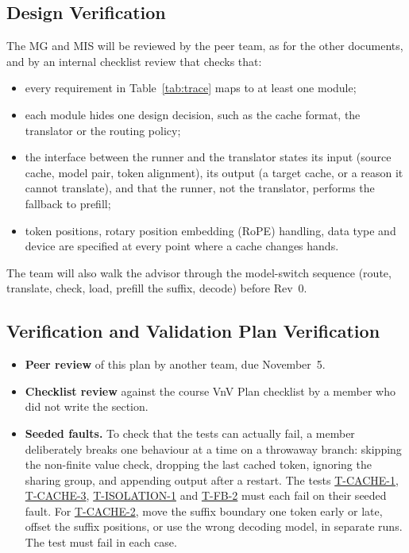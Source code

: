 \documentclass[12pt, titlepage]{article}
\newcommand{\tref}[1]{\hyperref[test:#1]{#1}}
\begin{document}
\subsection{Design Verification}

The MG and MIS will be reviewed by the peer team, as for the other
documents, and by an internal checklist review that checks that:
\begin{itemize}
  \item every requirement in Table~\ref{tab:trace} maps to at least one
  module;
  \item each module hides one design decision, such as the cache format, the
  translator or the routing policy;
  \item the interface between the runner and the translator states its input
  (source cache, model pair, token alignment), its output (a target cache,
  or a reason it cannot translate), and that the runner, not the
  translator, performs the fallback to prefill;
  \item token positions, rotary position embedding (RoPE) handling, data
  type and device are specified at every point where a cache changes
  hands.
\end{itemize}
The team will also walk the advisor through the model-switch sequence
(route, translate, check, load, prefill the suffix, decode) before Rev~0.

\subsection{Verification and Validation Plan Verification}

\begin{itemize}
  \item \textbf{Peer review} of this plan by another team, due November~5.
  \item \textbf{Checklist review} against the course VnV Plan checklist by a
  member who did not write the section.
  \item \textbf{Seeded faults.} To check that the tests can actually fail,
  a member deliberately breaks one behaviour at a time on a throwaway
  branch: skipping the non-finite value check, dropping the last cached
  token, ignoring the sharing group, and appending output after a restart.
  The tests \tref{T-CACHE-1}, \tref{T-CACHE-3}, \tref{T-ISOLATION-1} and
  \tref{T-FB-2} must each fail on their seeded fault.
  For \tref{T-CACHE-2}, move the suffix boundary one token early or late,
  offset the suffix positions, or use the wrong decoding model, in separate
  runs. The test must fail in each case.
\end{itemize}
\end{document}
